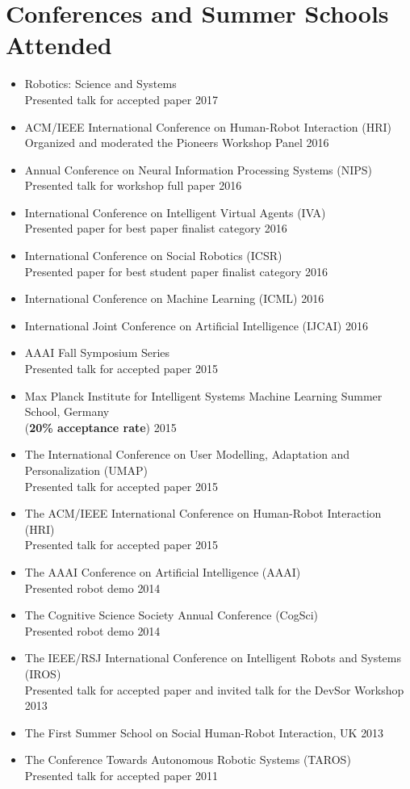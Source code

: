 \documentclass[10pt,letterpaper]{article}
\newcommand{\thing}[2]{{#1} \hfill {#2}}
\begin{document}
\section{Conferences and Summer Schools Attended}
\begin{itemize}%
\item \thing{Robotics: Science and Systems\\Presented talk for accepted paper}{2017}
\item \thing{ACM/IEEE International Conference on Human-Robot Interaction (HRI)\\Organized and moderated the Pioneers Workshop Panel}{2016}
\item \thing{Annual Conference on Neural Information Processing Systems (NIPS)\\Presented talk for workshop full paper}{2016}
\item \thing{International Conference on Intelligent Virtual Agents (IVA)\\Presented paper for best paper finalist category}{2016}
\item \thing{International Conference on Social Robotics (ICSR)\\Presented paper for best student paper finalist category}{2016}
\item \thing{International Conference on Machine Learning (ICML)}{2016}
\item \thing{International Joint Conference on Artificial Intelligence (IJCAI)}{2016}
\item \thing{AAAI Fall Symposium Series\\Presented talk for accepted paper}{2015}
\item \thing{Max Planck Institute for Intelligent Systems Machine Learning Summer School, Germany\\({\bf 20\% acceptance rate})}{2015}
\item \thing{The International Conference on User Modelling, Adaptation and Personalization (UMAP)\\Presented talk for accepted paper}{2015}
\item \thing{The ACM/IEEE International Conference on Human-Robot Interaction (HRI)\\Presented talk for accepted paper}{2015}
\item \thing{The AAAI Conference on Artificial Intelligence (AAAI)\\Presented robot demo}{2014}
\item \thing{The Cognitive Science Society Annual Conference (CogSci)\\Presented robot demo}{2014}
\item \thing{The IEEE/RSJ International Conference on Intelligent Robots and Systems (IROS)\\Presented talk for accepted paper and invited talk for the DevSor Workshop}{2013}
\item \thing{The First Summer School on Social Human-Robot Interaction, UK}{2013}
\item \thing{The Conference Towards Autonomous Robotic Systems (TAROS)\\Presented talk for accepted paper}{2011}
\end{itemize}
\end{document}
